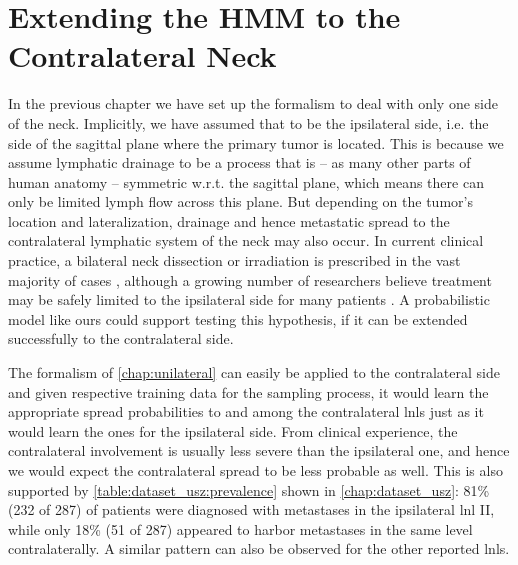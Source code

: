 \documentclass[\relativeRoot/main.tex]{subfiles}
\begin{document}
\chapter{Extending the HMM to the Contralateral Neck}
\label{chap:bilateral}

In the previous chapter we have set up the formalism to deal with only one side of the neck. Implicitly, we have assumed that to be the ipsilateral side, i.e. the side of the sagittal plane where the primary tumor is located. This is because we assume lymphatic drainage to be a process that is -- as many other parts of human anatomy -- symmetric w.r.t. the sagittal plane, which means there can only be limited lymph flow across this plane. But depending on the tumor's location and lateralization, drainage and hence metastatic spread to the contralateral lymphatic system of the neck may also occur. In current clinical practice, a bilateral neck dissection or irradiation is prescribed in the vast majority of cases \cite{de_veij_mestdagh_incidence_2019}, although a growing number of researchers believe treatment may be safely limited to the ipsilateral side for many patients \cite{rackley_unilateral_2017,de_veij_mestdagh_spectct-guided_2020}. A probabilistic model like ours could support testing this hypothesis, if it can be extended successfully to the contralateral side.

The formalism of \cref{chap:unilateral} can easily be applied to the contralateral side and given respective training data for the sampling process, it would learn the appropriate spread probabilities to and among the contralateral \glspl{lnl} just as it would learn the ones for the ipsilateral side. From clinical experience, the contralateral involvement is usually less severe than the ipsilateral one, and hence we would expect the contralateral spread to be less probable as well. This is also supported by \cref{table:dataset_usz:prevalence} shown in \cref{chap:dataset_usz}: 81\% (232 of 287) of patients were diagnosed with metastases in the ipsilateral \gls{lnl} II, while only 18\% (51 of 287) appeared to harbor metastases in the same level contralaterally. A similar pattern can also be observed for the other reported \glspl{lnl}.
\end{document}

